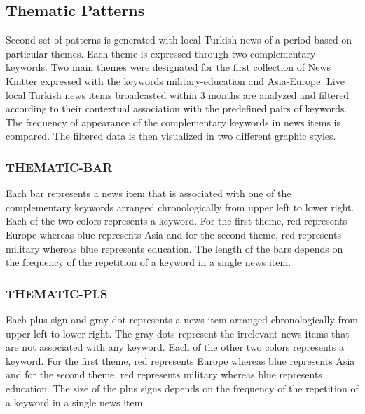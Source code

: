 \documentclass{acmsiggraph}                     %
\begin{document}
\subsection{Thematic Patterns}
Second set of patterns is generated with local Turkish news of a period based on particular themes. Each theme is expressed through two complementary keywords. Two main themes were designated for the first collection of News Knitter expressed with the keywords military-education and Asia-Europe. Live local Turkish news items broadcasted within 3 months are analyzed and filtered according to their contextual association with the predefined pairs of keywords. The frequency of appearance of the complementary keywords in news items is compared. The filtered data is then visualized in two different graphic styles.


\subsubsection{THEMATIC-BAR}
Each bar represents a news item that is associated with one of the complementary keywords arranged chronologically from upper left to lower right. Each of the two colors represents a keyword. For the first theme, red represents Europe whereas blue represents Asia and for the second theme, red represents military whereas blue represents education. The length of the bars depends on the frequency of the repetition of a keyword in a single news item.

\subsubsection{THEMATIC-PLS}
Each plus sign and gray dot represents a news item arranged chronologically from upper left to lower right. The gray dots represent the irrelevant news items that are not associated with any keyword. Each of the other two colors represents a keyword. For the first theme, red represents Europe whereas blue represents Asia and for the second theme, red represents military whereas blue represents education. The size of the plus signs depends on the frequency of the repetition of a keyword in a single news item.



\nocite{*}

\end{document}
